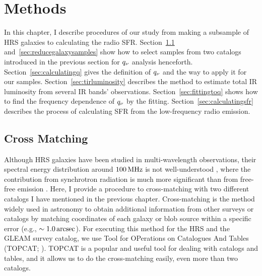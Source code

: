 \chapter{Methods}\label{chap:methods}
\begin{chapabstract}

In this chapter, I describe procedures of our study from making a subsample of HRS galaxies to calculating the radio SFR\@.
Section~\ref{sec:crossmatching} and~\ref{sec:reducegalaxysamples} show how to select samples from two catalogs introduced in the previous section for $q_{\nu}$ analysis henceforth.
Section~\ref{sec:calculatingq} gives the definition of $q_{\nu}$ and the way to apply it for our samples.
Section~\ref{sec:tirluminosity} describes the method to estimate total IR luminosity from several IR bands' observations.
Section~\ref{sec:fittingtoq} shows how to find the frequency dependence of $q_{\nu}$ by the fitting.
Section~\ref{sec:calculatingsfr} describes the process of calculating SFR from the low-frequency radio emission.

\end{chapabstract}

\section{Cross Matching}\label{sec:crossmatching}
Although HRS galaxies have been studied in multi-wavelength observations, their spectral energy distribution around $100\,\mathrm{MHz}$ is not well-understood \citep{Ciesla2014}, where the contribution from synchrotron radiation is much more significant than from free-free emission \citep{Condon1992a}.
Here, I provide a procedure to cross-matching with two different catalogs I have mentioned in the previous chapter.
Cross-matching is the method widely used in astronomy to obtain additional information from other surveys or catalogs by matching coordinates of each galaxy or blob source within a specific error (e.g., $\sim 1.0\,\mathrm{arcsec}$).
For executing this method for the HRS and the GLEAM survey catalog, we use Tool for OPerations on Catalogues And Tables (TOPCAT\@; \citealt{Taylor2009}).
TOPCAT is a popular and useful tool for dealing with catalogs and tables, and it allows us to do the cross-matching easily, even more than two catalogs.


